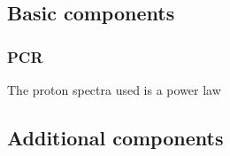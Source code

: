 \subsection{Basic components}
\subsubsection{PCR}

The proton spectra used is a power law 

%	

\subsection{Additional components}


